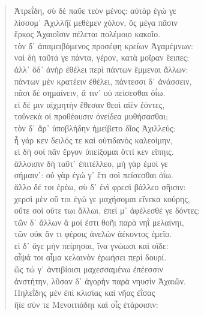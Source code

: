 \begin{Spacing}{1.5}
\begin{verse}
{\large\g Ἀτρεΐδη, σὺ δὲ παῦε τεὸν μένος: αὐτὰρ ἐγώ γε  } \\
{\large\g λίσσομ᾽ Ἀχιλλῆϊ μεθέμεν χόλον, ὃς μέγα πᾶσιν  } \\
{\large\g ἕρκος Ἀχαιοῖσιν πέλεται πολέμοιο κακοῖο.  } \\
{\large\g τὸν δ᾽ ἀπαμειβόμενος προσέφη κρείων Ἀγαμέμνων:  } \\
{\large\g ναὶ δὴ ταῦτά γε πάντα, γέρον, κατὰ μοῖραν ἔειπες:  } \\
{\large\g ἀλλ᾽ ὅδ᾽ ἀνὴρ ἐθέλει περὶ πάντων ἔμμεναι ἄλλων:  } \\
{\large\g πάντων μὲν κρατέειν ἐθέλει, πάντεσσι δ᾽ ἀνάσσειν,  } \\
{\large\g πᾶσι δὲ σημαίνειν, ἅ τιν᾽ οὐ πείσεσθαι ὀΐω.  } \\
{\large\g εἰ δέ μιν αἰχμητὴν ἔθεσαν θεοὶ αἰὲν ἐόντες,  } \\
{\large\g τοὔνεκά οἱ προθέουσιν ὀνείδεα μυθήσασθαι;  } \\
{\large\g τὸν δ᾽ ἄρ᾽ ὑποβλήδην ἠμείβετο δῖος Ἀχιλλεύς:  } \\
{\large\g ἦ γάρ κεν δειλός τε καὶ οὐτιδανὸς καλεοίμην,  } \\
{\large\g εἰ δὴ σοὶ πᾶν ἔργον ὑπείξομαι ὅττί κεν εἴπηις.  } \\
{\large\g ἄλλοισιν δὴ ταῦτ᾽ ἐπιτέλλεο, μὴ γὰρ ἐμοί γε  } \\
{\large\g σήμαιν᾽: οὐ γὰρ έγώ γ᾽ ἔτι σοὶ πείσεσθαι ὀΐω.  } \\
{\large\g ἄλλο δέ τοι ἐρέω, σὺ δ᾽ ἐνὶ φρεσὶ βάλλεο σῆισιν:  } \\
{\large\g χερσὶ μὲν οὔ τοι ἐγώ γε μαχήσομαι εἵνεκα κούρης,  } \\
{\large\g οὔτε σοὶ οὔτε τωι ἄλλωι, ἐπεί μ᾽ ἀφέλεσθέ γε δόντες:  } \\
{\large\g τῶν δ᾽ ἄλλων ἅ μοί ἐστι θοῆι παρὰ νηῒ μελαίνηι,  } \\
{\large\g τῶν οὐκ ἄν τι φέροις ἀνελὼν ἀέκοντος ἐμεῖο.  } \\
{\large\g εἰ δ᾽ ἄγε μὴν πείρησαι, ἵνα γνώωσι καὶ οἵδε:  } \\
{\large\g αἶψά τοι αἷμα κελαινὸν ἐρωήσει περὶ δουρί.  } \\
{\large\g ὣς τώ γ᾽ ἀντιβίοισι μαχεσσαμένω ἐπέεσσιν  } \\
{\large\g ἀνστήτην, λῦσαν δ᾽ ἀγορὴν παρὰ νηυσὶν Ἀχαιῶν.  } \\
{\large\g Πηλεΐδης μὲν ἐπὶ κλισίας καὶ νῆας ἐΐσας  } \\
{\large\g ἤϊε σύν τε Μενοιτιάδηι καὶ οἷς ἑτάροισιν:  } \\

\end{verse}
\end{Spacing}
